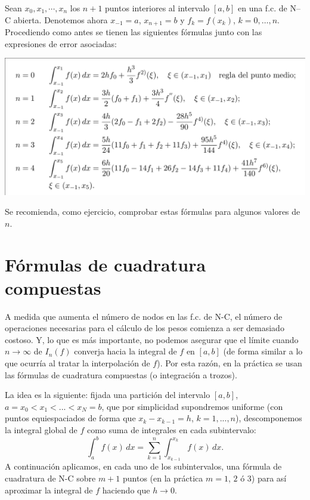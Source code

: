 \begin{example}
  Sean $x_0,x_1,\cdots,x_n$ los $n+1$ puntos interiores al intervalo
  $[a,b]$ en una f.c. de N--C abierta. Denotemos ahora $x_{-1}=a$,
  $x_{n+1}=b$ y $f_k=f(x_k)$, $k=0,\dots,n$. Procediendo como antes
  se tienen las siguientes fórmulas junto con las expresiones de error
  asociadas:
  \begin{center}
    \includegraphics[width=0.95\linewidth]{tema3/formulas-nc-abiertas}
  \end{center}
  Se recomienda, como ejercicio, comprobar estas fórmulas para algunos
  valores de $n$.
\end{example}

\section{Fórmulas de cuadratura compuestas}
\label{sec:fc-compuestas}

A medida que aumenta el número de nodos en las f.c. de N-C, el número
de operaciones necesarias para el cálculo de los pesos comienza a ser
demasiado costoso. Y, lo que es más importante, no podemos asegurar
que el límite cuando $n\to\infty$ de $I_n(f)$ converja hacia la
integral de $f$ en $[a,b]$ (de forma similar a lo que ocurría al
tratar la interpolación de $f$). Por esta razón, en  la práctica se
usan las fórmulas de cuadratura compuestas (o integración a trozos).

La idea es la siguiente: fijada una partición del intervalo $[a,b]$,
$a=x_0<x_1<...<x_N=b$, que por simplicidad supondremos uniforme (con
puntos equiespaciados de forma que $x_k-x_{k-1}=h$, $k=1,...,n$),
descomponemos la integral global de $f$ como suma de integrales en
cada subintervalo:
\begin{equation*}
  \int_a^b f(x)\,dx = \sum_{k=1}^n \int_{x_{k-1}}^{x_k}f(x)\,dx.
\end{equation*}
A continuación aplicamos, en cada uno de los subintervalos, una
fórmula de cuadratura de N-C sobre $m+1$ puntos (en la práctica
$m=1$, $2$ ó $3$) para así aproximar la integral de $f$ haciendo que
$h\to 0$. 

